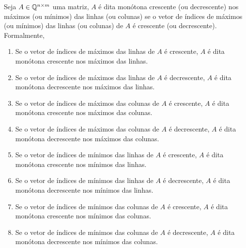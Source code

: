 \begin{defi}
Seja $A \in \mathbb{Q}^{n \times m}$ uma matriz, $A$ é dita monótona crescente (ou decrescente) nos máximos (ou mínimos) das linhas (ou colunas) se o vetor de índices de máximos (ou mínimos) das linhas (ou colunas) de $A$ é crescente (ou decrescente). Formalmente,
    \begin{enumerate}
        \item Se o vetor de índices de máximos das linhas de $A$ é crescente, $A$ é dita monótona crescente nos máximos das linhas.
        \item Se o vetor de índices de máximos das linhas de $A$ é decrescente, $A$ é dita monótona decrescente nos máximos das linhas.
        \item Se o vetor de índices de máximos das colunas de $A$ é crescente, $A$ é dita monótona crescente nos máximos das colunas.
        \item Se o vetor de índices de máximos das colunas de $A$ é decrescente, $A$ é dita monótona decrescente nos máximos das colunas.
        \item Se o vetor de índices de mínimos das linhas de $A$ é crescente, $A$ é dita monótona crescente nos mínimos das linhas.
        \item Se o vetor de índices de mínimos das linhas de $A$ é decrescente, $A$ é dita monótona decrescente nos mínimos das linhas.
        \item Se o vetor de índices de mínimos das colunas de $A$ é crescente, $A$ é dita monótona crescente nos mínimos das colunas.
        \item Se o vetor de índices de mínimos das colunas de $A$ é decrescente, $A$ é dita monótona decrescente nos mínimos das colunas.
    \end{enumerate}
\end{defi}

\begin{defi}
\end{defi}
